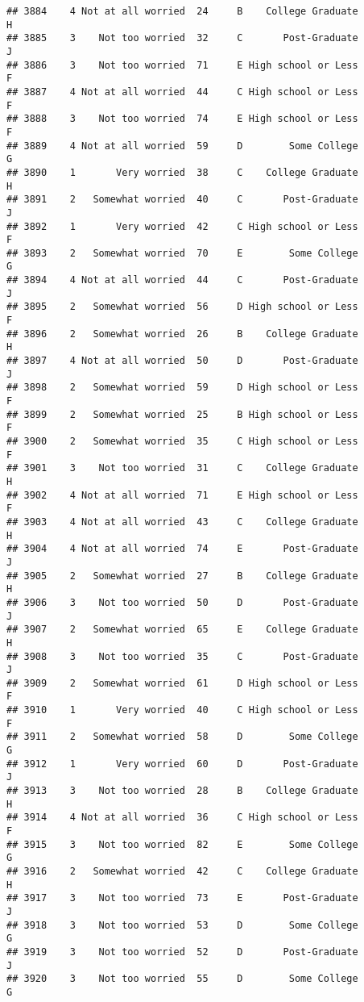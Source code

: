 \documentclass[
]{article}
\begin{document}
\begin{verbatim}
## 3884    4 Not at all worried  24     B    College Graduate         H
## 3885    3    Not too worried  32     C       Post-Graduate         J
## 3886    3    Not too worried  71     E High school or Less         F
## 3887    4 Not at all worried  44     C High school or Less         F
## 3888    3    Not too worried  74     E High school or Less         F
## 3889    4 Not at all worried  59     D        Some College         G
## 3890    1       Very worried  38     C    College Graduate         H
## 3891    2   Somewhat worried  40     C       Post-Graduate         J
## 3892    1       Very worried  42     C High school or Less         F
## 3893    2   Somewhat worried  70     E        Some College         G
## 3894    4 Not at all worried  44     C       Post-Graduate         J
## 3895    2   Somewhat worried  56     D High school or Less         F
## 3896    2   Somewhat worried  26     B    College Graduate         H
## 3897    4 Not at all worried  50     D       Post-Graduate         J
## 3898    2   Somewhat worried  59     D High school or Less         F
## 3899    2   Somewhat worried  25     B High school or Less         F
## 3900    2   Somewhat worried  35     C High school or Less         F
## 3901    3    Not too worried  31     C    College Graduate         H
## 3902    4 Not at all worried  71     E High school or Less         F
## 3903    4 Not at all worried  43     C    College Graduate         H
## 3904    4 Not at all worried  74     E       Post-Graduate         J
## 3905    2   Somewhat worried  27     B    College Graduate         H
## 3906    3    Not too worried  50     D       Post-Graduate         J
## 3907    2   Somewhat worried  65     E    College Graduate         H
## 3908    3    Not too worried  35     C       Post-Graduate         J
## 3909    2   Somewhat worried  61     D High school or Less         F
## 3910    1       Very worried  40     C High school or Less         F
## 3911    2   Somewhat worried  58     D        Some College         G
## 3912    1       Very worried  60     D       Post-Graduate         J
## 3913    3    Not too worried  28     B    College Graduate         H
## 3914    4 Not at all worried  36     C High school or Less         F
## 3915    3    Not too worried  82     E        Some College         G
## 3916    2   Somewhat worried  42     C    College Graduate         H
## 3917    3    Not too worried  73     E       Post-Graduate         J
## 3918    3    Not too worried  53     D        Some College         G
## 3919    3    Not too worried  52     D       Post-Graduate         J
## 3920    3    Not too worried  55     D        Some College         G

\end{verbatim}
\end{document}
